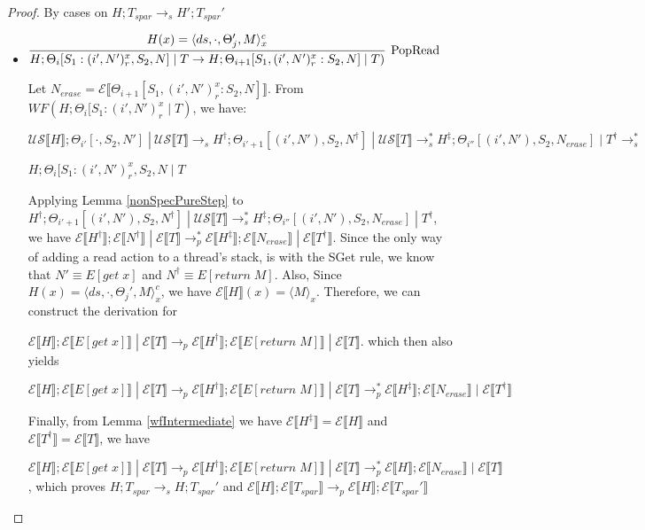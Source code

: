 \documentclass[9pt]{article}
\newcommand\specStep{\rightarrow_{s}}
\newcommand\parStep{\rightarrow_{p}}
\newcommand{\eval}[1]{E[#1]}
\newcommand{\erase}[1]{\mathcal{E}\llbracket #1 \rrbracket}
\newcommand{\unSpec}[1]{\mathcal{US} \llbracket #1 \rrbracket}
\begin{document}
\begin{proof}
By cases on $H; T_{spar} \specStep H'; T_{spar}'$

\begin{itemize}

\item $\infer[\text{PopRead}]{H; \Theta_i[S_1 : (i', N')_r^x, S_2, N] \; | \; T \rightarrow H; \Theta_{i+1}[S_1, (i', N')_r^x : S_2, N] \; | \; T)}{H(x) = \langle ds, \cdot, \Theta_j', M\rangle_x^c}$

Let $N_{erase} = \erase{\Theta_{i+1}[S_1, (i', N')_r^x : S_2, N]}$.  From $WF(H; \Theta_i[S_1 : (i', N')_r^x \; | \; T)$, we have:

$\unSpec{H}; \Theta_{i'}[\cdot, S_2, N'] \; | \ \unSpec{T} \specStep H^\dagger; \Theta_{i'+1}[(i', N'), S_2, N^\dagger] \; | \; \unSpec{T} \specStep^* H^\ddagger; \Theta_{i''}[(i', N'), S_2, N_{erase}] \; | \; T^\dagger \specStep^*$

$H; \Theta_i[S_1 : (i', N')_r^x, S_2, N \; | \; T$

Applying Lemma \ref{nonSpecPureStep} to $H^\dagger; \Theta_{i'+1}[(i', N'), S_2, N^\dagger] \; | \; \unSpec{T} \specStep^* H^\ddagger; \Theta_{i''}[(i', N'), S_2, N_{erase}] \; | \; T^\dagger$, we have $\erase{H^\dagger}; \erase{N^\dagger} \; | \; \erase{T} \parStep^* \erase{H^\ddagger}; \erase{N_{erase}} \; | \; \erase{T^\dagger}$.  Since the only way of adding a read action to a thread's stack, is with the SGet rule, we know that $N' \equiv \eval{get \; x}$ and $N^\dagger \equiv \eval{return \; M}$.  Also, Since $H(x) = \langle ds, \cdot, \Theta_j', M\rangle_x^c$, we have $\erase{H}(x) = \langle M\rangle_x$.  Therefore, we can construct the derivation for 

$\erase{H}; \erase{\eval{get \; x}} \; | \; \erase{T} \parStep \erase{H^\dagger}; \erase{\eval{return \; M}} \; | \; \erase{T}$.  which then also yields

$\erase{H}; \erase{\eval{get \; x}} \; | \; \erase{T} \parStep \erase{H^\dagger}; \erase{\eval{return \; M}} \; | \; \erase{T} \parStep^*  \erase{H^\ddagger}; \erase{N_{erase}} \; | \; \erase{T^\dagger}$

Finally, from Lemma \ref{wfIntermediate} we have $\erase{H^\ddagger} = \erase{H}$ and $\erase{T^\dagger} = \erase{T}$, we have 

$\erase{H}; \erase{\eval{get \; x}} \; | \; \erase{T} \parStep \erase{H^\dagger}; \erase{\eval{return \; M}} \; | \; \erase{T} \parStep^*  \erase{H}; \erase{N_{erase}} \; | \; \erase{T}$, which proves $H; T_{spar} \specStep H; T_{spar}'$ and $\erase{H}; \erase{T_{spar}} \parStep \erase{H}; \erase{T_{spar}'}$


\end{itemize}
\end{proof}
\end{document}
